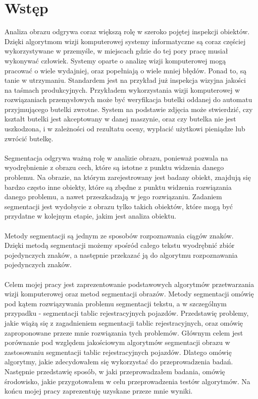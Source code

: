 \section{Wstęp}
Analiza obrazu odgrywa coraz większą rolę w szeroko pojętej inspekcji obiektów. Dzięki algorytmom wizji komputerowej systemy informatyczne są coraz częściej wykorzystywane w przemyśle, w miejscach gdzie do tej pory pracę musiał wykonywać człowiek. Systemy oparte o analizę wizji komputerowej mogą pracować o wiele wydajniej, oraz popełniają o wiele mniej błędów. Ponad to, są tanie w utrzymaniu. Standardem jest na przykład już inspekcja wizyjna jakości na taśmach produkcyjnych. Przykładem wykorzystania wizji komputerowej w rozwiązaniach przemysłowych może być weryfikacja butelki oddanej do automatu przyjmującego butelki zwrotne. System na podstawie zdjęcia może stwierdzić, czy kształt butelki jest akceptowany w danej maszynie, oraz czy butelka nie jest uszkodzona, i w zależności od rezultatu oceny, wypłacić użytkowi pieniądze lub zwrócić butelkę.
\paragraph{}
Segmentacja odgrywa ważną rolę w analizie obrazu, ponieważ pozwala na wyodrębnienie z obrazu cech, które są istotne z punktu widzenia danego problemu. Na obrazie, na którym zarejestrowany jest badany obiekt, znajdują się bardzo często inne obiekty, które są zbędne z punktu widzenia rozwiązania danego problemu, a nawet przeszkadzają w jego rozwiązaniu. Zadaniem segmentacji jest wydobycie z obrazu tylko takich obiektów, które mogą być przydatne w kolejnym etapie, jakim jest analiza obiektu.
\paragraph{}
Metody segmentacji są jednym ze sposobów rozpoznawania ciągów znaków. Dzięki metodą segmentacji możemy spośród całego tekstu wyodrębnić zbiór pojedynczych znaków, a następnie przekazać ją do algorytmu rozpoznawania pojedynczych znaków.
\paragraph{}
Celem mojej pracy jest zaprezentowanie podstawowych algorytmów przetwarzania wizji komputerowej oraz metod segmentacji obrazów. Metody segmentacji omówię pod kątem rozwiązywania problemu segmentacji tekstu, a w szczególnym przypadku - segmentacji tablic rejestracyjnych pojazdów. Przedstawię problemy, jakie wiążą się z zagadnieniem segmentacji tablic rejestracyjnych, oraz omówię zaproponowane przeze mnie rozwiązania tych problemów. Głównym celem jest porównanie pod względem jakościowym algorytmów segmentacji obrazu w zastosowaniu segmentacji tablic rejestracyjnych pojazdów. Dlatego omówię algorytmy, jakie zdecydowałem się wykorzystać do przeprowadzenia badań. Następnie przedstawię sposób, w jaki przeprowadzałem badania, omówię środowisko, jakie przygotowałem w celu przeprowadzenia testów algorytmów. Na końcu mojej pracy zaprezentuję uzyskane przeze mnie wyniki.
